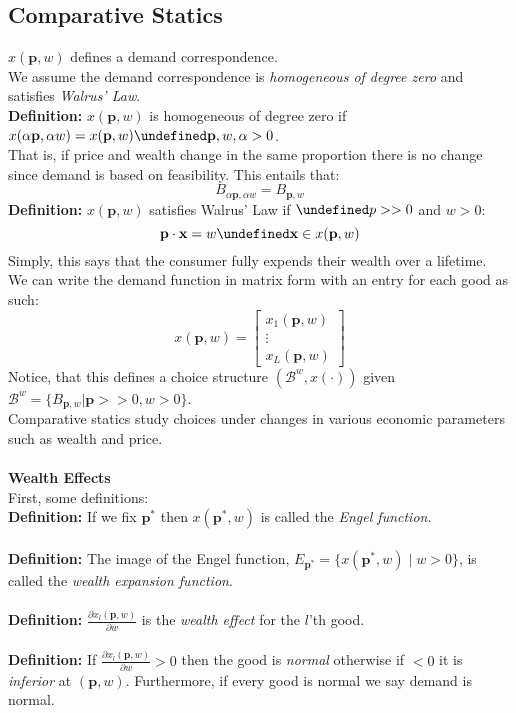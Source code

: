 \documentclass[12pt]{article}
\let\oldforall\forall
\let\forall\undefined
\let\bf\oldbf
\let\bf\textbf
\DeclareMathOperator{\forall}{\,\oldforall\,}
\begin{document}
\subsection{Comparative Statics}
$x(\bf{p}, w)$ defines a demand correspondence.
\\ We assume the demand correspondence is \emph{homogeneous of degree zero} and satisfies \emph{Walrus' Law}.
\\ \bf{Definition:} $x(\bf{p}, w)$ is homogeneous of degree zero if $x(\alpha\bf{p}, \alpha w) = x(\bf{p}, w) \forall \bf{p}, w, \alpha > 0$.
\\ That is, if price and wealth change in the same proportion there is no change since demand is based on feasibility. This entails that:
$$B_{\alpha\bf{p}, \alpha w} = B_{\bf{p}, w}$$
\bf{Definition:} $x(\bf{p}, w)$ satisfies Walrus' Law if $\forall p >> 0 $ and $w > 0$:
$$\bf{p}\cdot\bf{x} = w \forall \bf{x} \in x(\bf{p}, w)$$
Simply, this says that the consumer fully expends their wealth over a lifetime. 
\\ We can write the demand function in matrix form with an entry for each good as such:
$$x(\bf{p}, w) = \begin{bmatrix} 
x_1(\bf{p}, w) \\
\vdots \\
x_L(\bf{p}, w) 
\end{bmatrix}$$
Notice, that this defines a choice structure $(\mathcal{B}^w, x(\cdot))$ given $\mathcal{B}^w = \{B_{\bf{p}, w} | \bf{p} >> 0, w > 0 \}$.
\vspace{10pt}
\\Comparative statics study choices under changes in various economic parameters such as wealth and price.
\\\bf{\\Wealth Effects}
\\ First, some definitions:
\\ \bf{Definition:} If we fix $\bf{p}^*$ then $x(\bf{p}^*, w)$ is called the \emph{Engel function}.
\\ \bf{\\Definition:} The image of the Engel function, $E_{\bf{p}^*} = \{x(\bf{p}^*,w) \; | \; w > 0\}$, is called the \emph{wealth expansion function}.
\\ \bf{\\Definition:} $\frac{\partial x_l(\bf{p},w)}{\partial w}$ is the \emph{wealth effect} for the $l$'th good.
\\ \bf{\\Definition:} If $\frac{\partial x_l(\bf{p},w)}{\partial w} > 0$ then the good is \emph{normal} otherwise if $< 0$ it is \emph{inferior} at $(\bf{p}, w)$. Furthermore, if every good is normal we say demand is normal.
\end{document}
